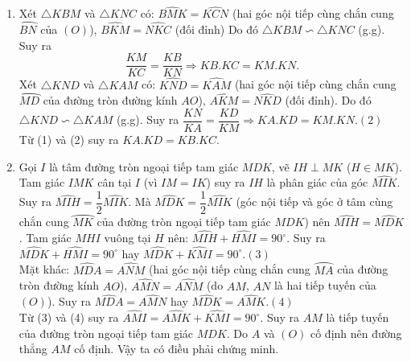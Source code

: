 \begin{ex}
{\begin{enumerate}
        $AM$, $AN$ là các tiếp tuyến của $(O)$ nên $\widehat{AMO}={{90}^{\circ}}$ và $\widehat{ANO}=90^{\circ}$.
        Suy ra $\widehat{AMO}=\widehat{ANO}=\widehat{ADO}=90^{\circ}$. 
        Do đó tứ giác $AMDN$ nội tiếp đường tròn đường kính $AO$.
      \item  Xét $\triangle KBM$ và $\triangle KNC$ có: 
      $\widehat{BMK}=\widehat{KCN}$ (hai góc nội tiếp cùng chắn cung $\wideparen{BN}$ của $(O)$),
      $\widehat{BKM}=\widehat{NKC}$ (đối đỉnh)
      Do đó $\triangle KBM\backsim \triangle KNC$ (g.g).
     Suy ra 
     \[\dfrac{KM}{KC}=\dfrac{KB}{KN}\Rightarrow  KB.KC=KM.KN.\tag{1}\]
      Xét $\triangle KND$  và  $\triangle KAM$ có: 
      $\widehat{KND}=\widehat{KAM}$ (hai góc nội tiếp cùng chắn cung $\wideparen{MD}$ của đường  tròn đường kính $AO$), 
      $\widehat{AKM}=\widehat{NKD}$ (đối đỉnh).
      Do đó $\triangle KND\backsim \triangle KAM $ (g.g).
      Suy ra $\dfrac{KN}{KA}=\dfrac{KD}{KM} \Rightarrow KA.KD=KM.KN$.\hfill$(2)$\\
      Từ (1) và (2) suy ra $KA.KD=KB.KC$.
\item Gọi $I$ là tâm đường tròn ngoại tiếp tam giác $MDK$, vẽ $IH \perp MK$ ($H\in MK$).
Tam giác $IMK$ cân tại $I$ (vì $IM = IK$) suy ra $IH$ là phân giác của góc $\widehat{MIK}$. Suy ra 
$\widehat{MIH}=\dfrac{1}{2}\widehat{MIK}$.
Mà $\widehat{MDK}=\dfrac{1}{2}\widehat{MIK}$ (góc nội tiếp và góc ở tâm cùng chắn cung $\wideparen{MK}$ của đường tròn ngoại tiếp tam giác $MDK$) nên
$\widehat{MIH}=\widehat{MDK}$.
Tam giác $MHI$ vuông tại $H$ nên: $\widehat{MIH}+\widehat{HMI}=90^{\circ}$. Suy ra 
$\widehat{MDK}+\widehat{HMI}=90^{\circ}$ hay $\widehat{MDK}+\widehat{KMI}=90^{\circ}$.\hfill$(3)$\\
Mặt khác: $\widehat{MDA}=\widehat{ANM}$ (hai góc nội tiếp cùng chắn cung $\wideparen{MA}$ của đường tròn đường kính $AO$),
$\widehat{AMN}=\widehat{ANM}$ (do $AM$, $AN$ là hai tiếp tuyến của $(O)$). Suy ra 
$\widehat{MDA}=\widehat{AMN}$ hay $\widehat{MDK}=\widehat{AMK}$.\hfill$(4)$\\
Từ (3) và (4) suy ra $\widehat{AMI}=\widehat{AMK}+\widehat{KMI}=90^{\circ}$.
Suy ra $AM$ là tiếp tuyến của đường tròn ngoại tiếp tam giác $MDK$.
Do $A$ và $(O)$ cố định nên đường thẳng $AM$ cố định.
Vậy ta có điều phải chứng minh.
\end{enumerate}
}
\end{ex}

